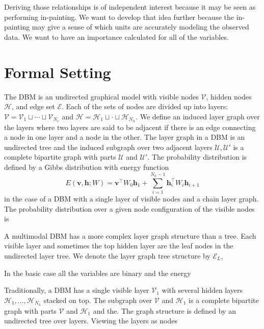 \documentclass{article} %
\begin{document}
Deriving those relationships is of independent interest because it may be seen as performing in-painting.  We want to develop that idea
further because the in-painting may give a sense of which units are accurately modeling the observed data. We want to have an importance
calculated for all of the variables.

\section{Formal Setting}

The DBM is an undirected graphical model with visible nodes $\mathcal{V}$, hidden nodes $\mathcal{H}$, and edge set
$\mathcal{E}$.  Each of the sets of nodes are divided up into layers: $\mathcal{V}=\mathcal{V}_1\sqcup\cdots\sqcup\mathcal{V}_{N_v}$
and $\mathcal{H}=\mathcal{H}_1\sqcup\cdot\sqcup\mathcal{H}_{N_h}$. We define an induced layer graph over the layers where two
layers are said to be adjacent if there is an edge connecting a node in one layer and a node in the other. The layer graph 
in a DBM is an undirected tree and the induced subgraph over two adjacent layers $\mathcal{U},\mathcal{U}'$ is a complete
bipartite graph with parts $\mathcal{U}$ and $\mathcal{U}'$. The probability distribution is defined by a Gibbs distribution
with energy function
\begin{equation}
E(\mathbf{v},\mathbf{h}; W) = \mathbf{v}^\top W_0 \mathbf{h}_1 +\sum_{i=1}^{N_h-1} \mathbf{h}_i^\top W_i \mathbf{h}_{i+1}
\end{equation}  
in the case of a DBM with a single layer of visible nodes and a chain layer graph. The probability distribution over a given
node configuration of the visible nodes is

A multimodal DBM has a more complex layer graph structure than a tree.  Each visible layer and sometimes the top hidden layer
are the leaf nodes in the undirected layer tree.  We denote the layer graph tree structure by $\mathcal{E}_L$, 

In the basic case all the variables are binary and the
energy 

 Traditionally, a DBM has a single visible layer $\mathcal{V}_1$
with several hidden layers $\mathcal{H}_1,\ldots,\mathcal{H}_{N_h}$ stacked on top. The subgraph over $\mathcal{V}$ and $\mathcal{H}_1$ 
is a complete bipartite
graph with parts $\mathcal{V}$ and $\mathcal{H}_1$ and the.   The graph structure is defined by an undirected tree over layers. Viewing
the layers as nodes 
\end{document}
